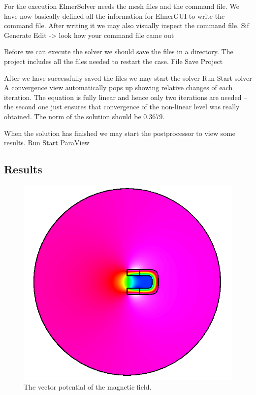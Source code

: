 For the execution 
ElmerSolver needs the mesh files and the command file. We have now basically defined
all the information for ElmerGUI to write the command file. After writing it we may also visually 
inspect the command file.
\ttbegin
Sif 
  Generate
  Edit -> look how your command file came out  
\ttend

Before we can execute the solver we should save the files in a directory. The project includes
all the files needed to restart the case.
\ttbegin
File 
  Save Project
\ttend

After we have successfully saved the files we may start the solver
\ttbegin
Run
  Start solver
\ttend
A convergence view automatically pops up showing relative changes of each iteration.
The equation is fully linear and hence only two iterations are needed -- the second 
one just ensures that convergence of the non-linear level was really obtained. 
The norm of the solution should be 0.3679.

When the solution has finished we may start the postprocessor to view some results.
\ttbegin
Run
  Start ParaView
\ttend


\subsection*{Results}


\begin{figure}[h]
\centering
\includegraphics[width=120 mm]{HorseShoeA}
\caption{The vector potential of the magnetic field.}\label{fg:HorseShoeA}
\end{figure}  

